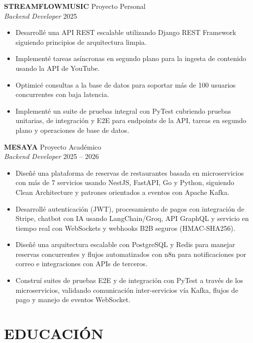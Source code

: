\documentclass[11pt, a4paper]{article}
\begin{document}
\vspace{4pt}

\textbf{STREAMFLOWMUSIC} \hfill Proyecto Personal \\
\textit{Backend Developer} \hfill 2025

\begin{itemize}
\item Desarrollé una API REST escalable utilizando Django REST Framework siguiendo principios de arquitectura limpia.
\item Implementé tareas asíncronas en segundo plano para la ingesta de contenido usando la API de YouTube.
\item Optimicé consultas a la base de datos para soportar más de 100 usuarios concurrentes con baja latencia.
\item Implementé un suite de pruebas integral con PyTest cubriendo pruebas unitarias, de integración y E2E para endpoints de la API, tareas en segundo plano y operaciones de base de datos.
\end{itemize}

\vspace{4pt}

\textbf{MESAYA} \hfill Proyecto Académico \\
\textit{Backend Developer} \hfill 2025 -- 2026

\begin{itemize}
\item Diseñé una plataforma de reservas de restaurantes basada en microservicios con más de 7 servicios usando NestJS, FastAPI, Go y Python, siguiendo Clean Architecture y patrones orientados a eventos con Apache Kafka.
\item Desarrollé autenticación (JWT), procesamiento de pagos con integración de Stripe, chatbot con IA usando LangChain/Groq, API GraphQL y servicio en tiempo real con WebSockets y webhooks B2B seguros (HMAC-SHA256).
\item Diseñé una arquitectura escalable con PostgreSQL y Redis para manejar reservas concurrentes y flujos automatizados con n8n para notificaciones por correo e integraciones con APIs de terceros.
\item Construí suites de pruebas E2E y de integración con PyTest a través de los microservicios, validando comunicación inter-servicios vía Kafka, flujos de pago y manejo de eventos WebSocket.
\end{itemize}

\section*{EDUCACIÓN}
\end{document}
